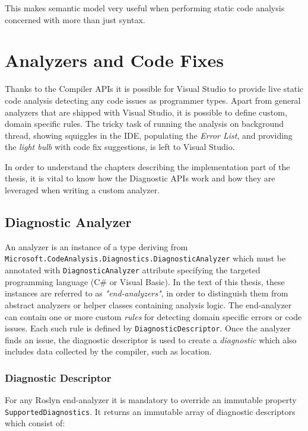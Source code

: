 \documentclass[
  digital, %
  table,   %
  lof,     %
  lot,     %
  oneside,
]{fithesis3}
\begin{document}
This makes semantic model very useful when performing static code analysis concerned with more than just syntax.
 
\section{Analyzers and Code Fixes}
\label{sec:analyzers-and-code-fixes}
Thanks to the Compiler APIs it is possible for Visual Studio to provide live static code analysis detecting any code issues as programmer types. Apart from general analyzers that are shipped with Visual Studio, it is possible to define custom, domain specific rules. The tricky task of running the analysis on background thread, showing squiggles in the IDE, populating the \textit{Error List}, and providing the \textit{light bulb} with code fix suggestions, is left to Visual Studio.

In order to understand the chapters describing the implementation part of the thesis, it is vital to know how the Diagnostic APIs work and how they are leveraged when writing a custom analyzer.

\subsection{Diagnostic Analyzer}
An analyzer is an instance of a type deriving from \texttt{Microsoft.CodeAnalysis.Diagnostics.DiagnosticAnalyzer} which must be annotated with \texttt{DiagnosticAnalyzer} attribute specifying the targeted programming language (C\# or Visual Basic)\cite{roslyn-succinctly}. In the text of this thesis, these instances are referred to as \textit{"end-analyzers"}, in order to distinguish them from abstract analyzers or helper classes containing analysis logic. The end-analyzer can contain one or more custom \textit{rules} for detecting domain specific errors or code issues. Each such rule is defined by \texttt{DiagnosticDescriptor}. Once the analyzer finds an issue, the diagnostic descriptor is used to create a \textit{diagnostic} which also includes data collected by the compiler, such as location.

\subsubsection{Diagnostic Descriptor}
For any Roslyn end-analyzer it is mandatory to override an immutable property \texttt{SupportedDiagnostics}. It returns an immutable array of diagnostic descriptors which consist of:
\end{document}
